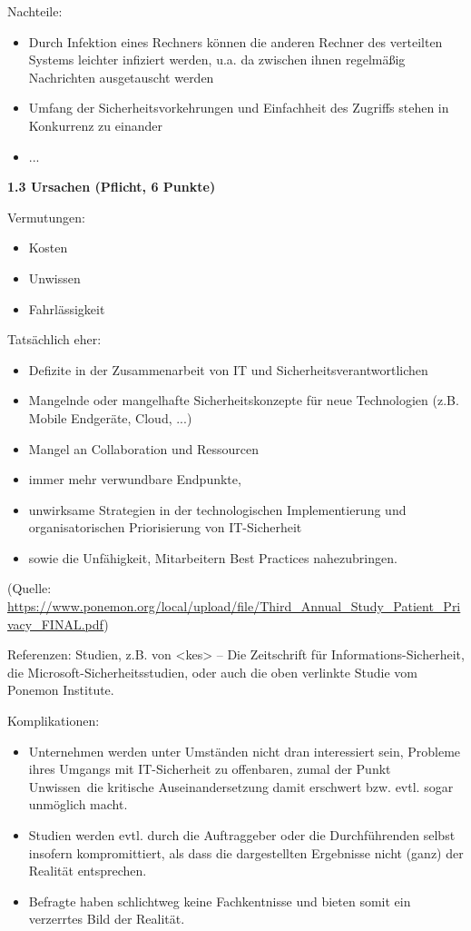 \documentclass[ngerman]{fbi-aufgabenblatt}
\begin{document}
Nachteile: 
\begin{itemize}
\item Durch Infektion eines Rechners können die anderen Rechner des verteilten Systems leichter infiziert werden, u.a. da zwischen ihnen regelmäßig Nachrichten ausgetauscht werden
\item Umfang der Sicherheitsvorkehrungen und Einfachheit des Zugriffs stehen in Konkurrenz zu einander
\item ...
\end{itemize}

\textbf{1.3 Ursachen (Pflicht, 6 Punkte)}

Vermutungen:

\begin{itemize} 
\item Kosten
\item Unwissen
\item Fahrlässigkeit
\end{itemize}

Tatsächlich eher: 

\begin{itemize} 
\item Defizite in der Zusammenarbeit von IT und Sicherheitsverantwortlichen
\item Mangelnde oder mangelhafte Sicherheitskonzepte für neue Technologien (z.B. Mobile Endgeräte, Cloud, ...)
\item Mangel an Collaboration und Ressourcen
\end{itemize}

\begin{itemize} 
\item immer mehr verwundbare Endpunkte, 
\item unwirksame Strategien in der technologischen Implementierung und organisatorischen Priorisierung von IT-Sicherheit 
\item sowie die Unfähigkeit, Mitarbeitern Best Practices nahezubringen.
\end{itemize}

(Quelle: \url{https://www.ponemon.org/local/upload/file/Third_Annual_Study_Patient_Privacy_FINAL.pdf})

Referenzen: 
Studien, z.B. von <kes> – Die Zeitschrift für Informations-Sicherheit, die Microsoft-Sicherheitsstudien, 
oder auch die oben verlinkte Studie vom Ponemon Institute.

Komplikationen: 
\begin{itemize}
\item Unternehmen werden unter Umständen nicht dran interessiert sein,
Probleme ihres Umgangs mit IT-Sicherheit zu offenbaren, zumal der Punkt \dq Unwissen\dq \ die kritische Auseinandersetzung damit erschwert bzw. evtl. sogar unmöglich macht.
\item Studien werden evtl. durch die Auftraggeber oder die Durchführenden selbst insofern kompromittiert, als dass die dargestellten Ergebnisse nicht (ganz) der Realität entsprechen.
\item Befragte haben schlichtweg keine Fachkentnisse und bieten somit ein verzerrtes Bild der Realität.
\end{itemize}
\end{document}
